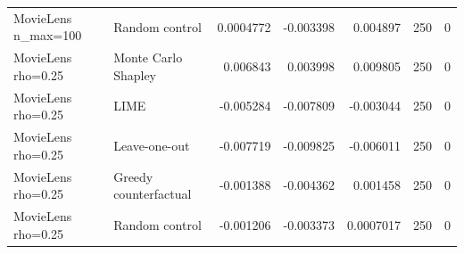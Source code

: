 \begin{table}[t]
{\begin{tabular}{llrrrrr}
MovieLens n\_max=100 & Random control & 0.0004772 & -0.003398 & 0.004897 & 250 & 0 \\
MovieLens rho=0.25 & Monte Carlo Shapley & 0.006843 & 0.003998 & 0.009805 & 250 & 0 \\
MovieLens rho=0.25 & LIME & -0.005284 & -0.007809 & -0.003044 & 250 & 0 \\
MovieLens rho=0.25 & Leave-one-out & -0.007719 & -0.009825 & -0.006011 & 250 & 0 \\
MovieLens rho=0.25 & Greedy counterfactual & -0.001388 & -0.004362 & 0.001458 & 250 & 0 \\
MovieLens rho=0.25 & Random control & -0.001206 & -0.003373 & 0.0007017 & 250 & 0 \\
\bottomrule
\end{tabular}
}
\end{table}
